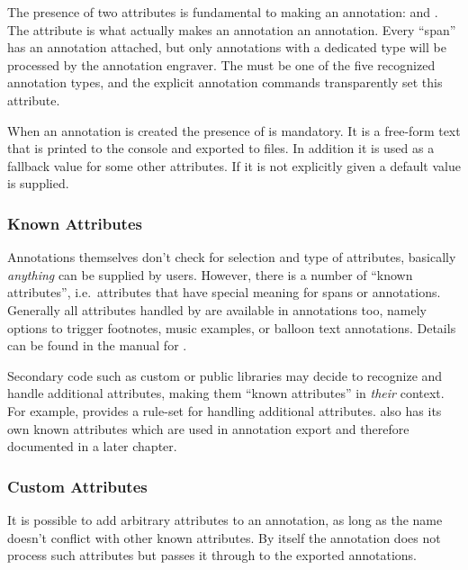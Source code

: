 \documentclass[]{ollmanual}
\begin{document}
The presence of two attributes is fundamental to making an annotation:
 and . The  attribute
is what actually makes an annotation an annotation. Every ``span'' has
an annotation attached, but only annotations with a dedicated type will
be processed by the annotation engraver. The  must be
one of the five recognized annotation types, and the explicit annotation
commands transparently set this attribute.

When an annotation is created the presence of  is
mandatory. It is a free-form text that is printed to the console and
exported to files. In addition it is used as a fallback value for some
other attributes. If it is not explicitly given a default value is
supplied.

\hypertarget{known-attributes}{%
\subsubsection{Known Attributes}\label{known-attributes}}

Annotations themselves don't check for selection and type of attributes,
basically \emph{anything} can be supplied by users. However, there is a
number of ``known attributes'', i.e.~attributes that have special
meaning for spans or annotations. Generally all attributes handled by
 are available in annotations too, namely
options to trigger footnotes, music examples, or balloon text
annotations. Details can be found in the manual for
.

Secondary code such as custom or public libraries may decide to
recognize and handle additional attributes, making them ``known
attributes'' in \emph{their} context. For example,
 provides a rule-set for handling
additional attributes.  also has its own
known attributes which are used in annotation export and therefore
documented in a later chapter.

\hypertarget{custom-attributes}{%
\subsubsection{Custom Attributes}\label{custom-attributes}}

It is possible to add arbitrary attributes to an annotation, as long as
the name doesn't conflict with other known attributes. By itself the
annotation does not process such attributes but passes it through to the
exported annotations.
\end{document}
